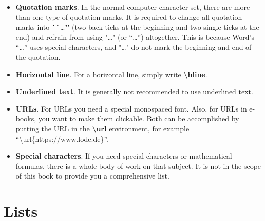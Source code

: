 \begin{itemize}
\item \textbf{Quotation marks}. In the normal computer character set, there are more than one type of quotation marks. It is required to change all quotation marks into \textbf{\`{}\`{}}\dots\textbf{\rq\rq} (two back ticks at the beginning and two single ticks at the end) and refrain from using "\dots" (or “\dots”) altogether. This is because Word's “\dots” uses special characters, and "\dots" do not mark the beginning and end of the quotation.

\item \textbf{Horizontal line}. For a horizontal line, simply write \textbf{\textbackslash hline}.

\item \textbf{Underlined text}. It is generally not recommended to use underlined text.

\item \textbf{URLs}. For URLs you need a special monospaced font. Also, for URLs in e-books, you want to make them clickable. Both can be accomplished by putting the URL in the \textbf{\textbackslash url} environment, for example ``\textbackslash url\{https://www.lode.de\}''.

\item \textbf{Special characters}. If you need special characters or mathematical formulas, there is a whole body of work on that subject. It is not in the scope of this book to provide you a comprehensive list.
\end{itemize}



\section{Lists}\label{c1_lists:sec}

